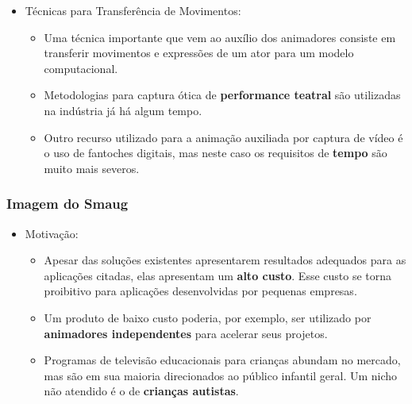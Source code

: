 \documentclass[brazil]{beamer}
\begin{document}
\begin{frame}

\begin{itemize}
      \item Técnicas para Transferência de Movimentos:
      
      \begin{itemize}
      
        \item Uma técnica importante que vem ao auxílio dos animadores consiste em transferir movimentos e expressões de um ator para um modelo computacional.
        
        \item Metodologias para captura ótica de \textbf{performance teatral} são utilizadas na indústria já há algum tempo.
        
        \item Outro recurso utilizado para a animação auxiliada por captura de vídeo é o uso de fantoches digitais, mas neste caso os requisitos de \textbf{tempo} são muito mais severos.
        
      \end{itemize}   
          
  \end{itemize} 
	
\end{frame}

\begin{frame}
  \frametitle{Imagem do Smaug}

\end{frame}

\begin{frame}
  \begin{itemize}
      \item Motivação:
      
      \begin{itemize}
      
        \item Apesar das soluções existentes apresentarem resultados adequados para as aplicações citadas, elas apresentam um \textbf{alto custo}. Esse custo se torna proibitivo para aplicações desenvolvidas por pequenas empresas.
        
        \item Um produto de baixo custo poderia, por exemplo, ser utilizado por \textbf{animadores independentes} para acelerar seus projetos.
        
        \item Programas de televisão educacionais para crianças abundam no mercado, mas são em sua maioria direcionados ao público infantil geral. Um nicho não atendido é o de
\textbf{crianças autistas}.
        
      \end{itemize}   
          
  \end{itemize} 

\end{frame}
\end{document}
